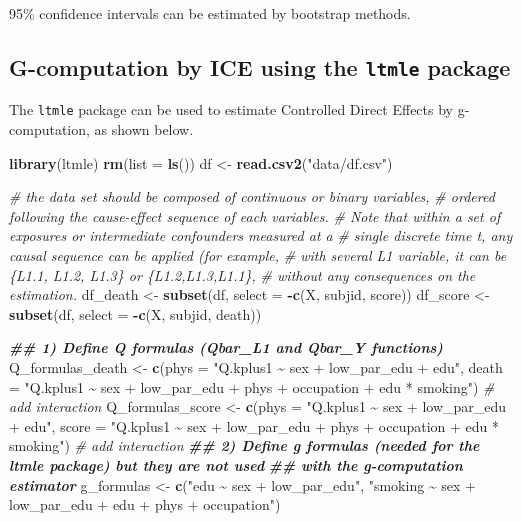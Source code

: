 \documentclass[
]{book}
\newenvironment{Shaded}{\begin{snugshade}}{\end{snugshade}}
\newcommand{\AttributeTok}[1]{\textcolor[rgb]{0.13,0.29,0.53}{#1}}
\newcommand{\CommentTok}[1]{\textcolor[rgb]{0.56,0.35,0.01}{\textit{#1}}}
\newcommand{\DocumentationTok}[1]{\textcolor[rgb]{0.56,0.35,0.01}{\textbf{\textit{#1}}}}
\newcommand{\FunctionTok}[1]{\textcolor[rgb]{0.13,0.29,0.53}{\textbf{#1}}}
\newcommand{\NormalTok}[1]{#1}
\newcommand{\OtherTok}[1]{\textcolor[rgb]{0.56,0.35,0.01}{#1}}
\newcommand{\SpecialCharTok}[1]{\textcolor[rgb]{0.81,0.36,0.00}{\textbf{#1}}}
\newcommand{\StringTok}[1]{\textcolor[rgb]{0.31,0.60,0.02}{#1}}
\begin{document}
95\% confidence intervals can be estimated by bootstrap methods.

\subsection{\texorpdfstring{G-computation by ICE using the \texttt{ltmle} package}{G-computation by ICE using the ltmle package}}\label{g-computation-by-ice-using-the-ltmle-package}

The \texttt{ltmle} package can be used to estimate Controlled Direct Effects by g-computation, as shown below.

\begin{Shaded}
\begin{Highlighting}[]
\FunctionTok{library}\NormalTok{(ltmle)}
\FunctionTok{rm}\NormalTok{(}\AttributeTok{list =} \FunctionTok{ls}\NormalTok{())}
\NormalTok{df }\OtherTok{\textless{}{-}} \FunctionTok{read.csv2}\NormalTok{(}\StringTok{"data/df.csv"}\NormalTok{)}

\CommentTok{\# the data set should be composed of continuous or binary variables,}
\CommentTok{\# ordered following the cause{-}effect sequence of each variables.}
\CommentTok{\# Note that within a set of exposures or intermediate confounders measured at a}
\CommentTok{\# single discrete time t, any causal sequence can be applied (for example,}
\CommentTok{\# with several L1 variable, it can be \{L1.1, L1.2, L1.3\} or \{L1.2,L1.3,L1.1\},}
\CommentTok{\# without any consequences on the estimation.}
\NormalTok{df\_death }\OtherTok{\textless{}{-}} \FunctionTok{subset}\NormalTok{(df, }\AttributeTok{select =} \SpecialCharTok{{-}}\FunctionTok{c}\NormalTok{(X, subjid, score))}
\NormalTok{df\_score }\OtherTok{\textless{}{-}} \FunctionTok{subset}\NormalTok{(df, }\AttributeTok{select =} \SpecialCharTok{{-}}\FunctionTok{c}\NormalTok{(X, subjid, death))}

\DocumentationTok{\#\# 1) Define Q formulas (Qbar\_L1 and Qbar\_Y functions)}
\NormalTok{Q\_formulas\_death }\OtherTok{\textless{}{-}} \FunctionTok{c}\NormalTok{(}\AttributeTok{phys =} \StringTok{"Q.kplus1 \textasciitilde{} sex + low\_par\_edu + edu"}\NormalTok{,}
                      \AttributeTok{death =} \StringTok{"Q.kplus1 \textasciitilde{} sex + low\_par\_edu + phys + occupation +}
\StringTok{                               edu * smoking"}\NormalTok{) }\CommentTok{\# add interaction}
\NormalTok{Q\_formulas\_score }\OtherTok{\textless{}{-}} \FunctionTok{c}\NormalTok{(}\AttributeTok{phys =} \StringTok{"Q.kplus1 \textasciitilde{} sex + low\_par\_edu + edu"}\NormalTok{,}
                    \AttributeTok{score =} \StringTok{"Q.kplus1 \textasciitilde{} sex + low\_par\_edu + phys + occupation +}
\StringTok{                             edu * smoking"}\NormalTok{) }\CommentTok{\# add interaction}
\DocumentationTok{\#\# 2) Define g formulas (needed for the ltmle package) but they are not used}
\DocumentationTok{\#\#    with the g{-}computation estimator}
\NormalTok{g\_formulas }\OtherTok{\textless{}{-}} \FunctionTok{c}\NormalTok{(}\StringTok{"edu \textasciitilde{} sex + low\_par\_edu"}\NormalTok{, }
                \StringTok{"smoking \textasciitilde{} sex + low\_par\_edu + edu + phys + occupation"}\NormalTok{)}


\end{Highlighting}
\end{Shaded}
\end{document}
